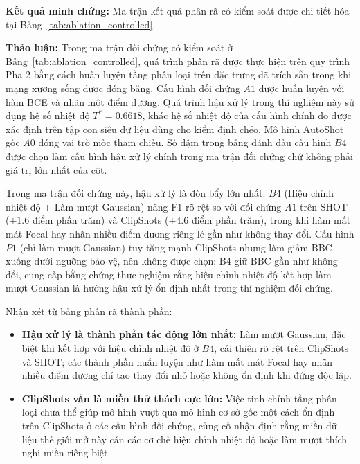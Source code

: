 \textbf{Kết quả minh chứng:} Ma trận kết quả phân rã có kiểm soát được chi tiết hóa tại Bảng~\ref{tab:ablation_controlled}.

\textbf{Thảo luận:} Trong ma trận đối chứng có kiểm soát ở Bảng~\ref{tab:ablation_controlled}, quá trình phân rã được thực hiện trên quy trình Pha 2 bằng cách huấn luyện tầng phân loại trên đặc trưng đã trích sẵn trong khi mạng xương sống được đóng băng. Cấu hình đối chứng $A1$ được huấn luyện với hàm BCE và nhãn một điểm dương. Quá trình hậu xử lý trong thí nghiệm này sử dụng hệ số nhiệt độ $T^*=0.6618$, khác hệ số nhiệt độ của cấu hình chính do được xác định trên tập con siêu dữ liệu dùng cho kiểm định chéo. Mô hình AutoShot gốc $A0$ đóng vai trò mốc tham chiếu. Số đậm trong bảng đánh dấu cấu hình $B4$ được chọn làm cấu hình hậu xử lý chính trong ma trận đối chứng chứ không phải giá trị lớn nhất của cột.

Trong ma trận đối chứng này, hậu xử lý là đòn bẩy lớn nhất: $B4$ (Hiệu chỉnh nhiệt độ + Làm mượt Gaussian) nâng F1 rõ rệt so với đối chứng $A1$ trên SHOT ($+1.6$ điểm phần trăm) và ClipShots ($+4.6$ điểm phần trăm), trong khi hàm mất mát Focal hay nhãn nhiều điểm dương riêng lẻ gần như không thay đổi. Cấu hình $P1$ (chỉ làm mượt Gaussian) tuy tăng mạnh ClipShots nhưng làm giảm BBC xuống dưới ngưỡng bảo vệ, nên không được chọn; B4 giữ BBC gần như không đổi, cung cấp bằng chứng thực nghiệm rằng hiệu chỉnh nhiệt độ kết hợp làm mượt Gaussian là hướng hậu xử lý ổn định nhất trong thí nghiệm đối chứng.

Nhận xét từ bảng phân rã thành phần:
\begin{itemize}
    \item \textbf{Hậu xử lý là thành phần tác động lớn nhất:} Làm mượt Gaussian, đặc biệt khi kết hợp với hiệu chỉnh nhiệt độ ở $B4$, cải thiện rõ rệt trên ClipShots và SHOT; các thành phần huấn luyện như hàm mất mát Focal hay nhãn nhiều điểm dương chỉ tạo thay đổi nhỏ hoặc không ổn định khi đứng độc lập.
    \item \textbf{ClipShots vẫn là miền thử thách cực lớn:} Việc tinh chỉnh tầng phân loại chưa thể giúp mô hình vượt qua mô hình cơ sở gốc một cách ổn định trên ClipShots ở các cấu hình đối chứng, củng cố nhận định rằng miền dữ liệu thế giới mở này cần các cơ chế hiệu chỉnh nhiệt độ hoặc làm mượt thích nghi miền riêng biệt.
\end{itemize}

